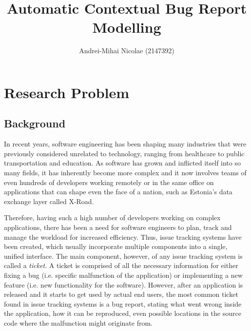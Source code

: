 \documentclass[11pt,english,twocolumn]{article}
\begin{document}
\title{Automatic Contextual Bug Report Modelling}

\author{Andrei-Mihai Nicolae (2147392)}
\date{}
\maketitle

\section{Research Problem}

\subsection*{Background}

In recent years, software engineering has been shaping many industries that were previously
considered unrelated to technology, ranging from healthcare to public transportation
and education. As software has grown and inflicted itself into so many fields, it has 
inherently become more complex and it now involves teams of even hundreds of developers working
remotely or in the same office on applications that can shape even the face of a nation, such
as Estonia's data exchange layer called X-Road\cite{x-road}.

Therefore, having such a high number of developers working on complex applications, there 
has been a need for software engineers to plan, track and manage the workload for increased 
efficiency. Thus, issue tracking systems have been created, which usually incorporate multiple
components into a single, unified interface. The main component, however, of any issue tracking system
is called a \emph{ticket}. A ticket is comprised of all the necessary information for either
fixing a bug (i.e. specific malfunction of the application) or implementing a new feature 
(i.e. new functionality for the software). However, after an application is released and 
it starts to get used by actual end users, the most common ticket found in issue tracking systems
is a bug report, stating what went wrong inside the application, how it can be reproduced,
even possible locations in the source code where the malfunction might originate from.
\end{document}
